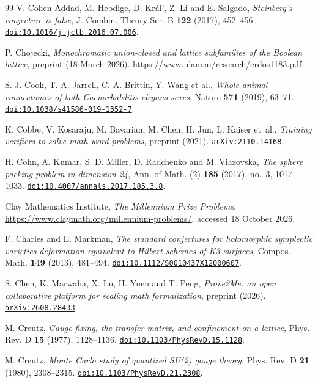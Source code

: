 \begin{thebibliography}{99}
V. Cohen-Addad, M. Hebdige, D. Kr\'al', Z. Li and E. Salgado,
\emph{Steinberg's conjecture is false},
J. Combin. Theory Ser. B \textbf{122} (2017), 452--456.
\href{https://doi.org/10.1016/j.jctb.2016.07.006}{\nolinkurl{doi:10.1016/j.jctb.2016.07.006}}.

P. Chojecki,
\emph{Monochromatic union-closed and lattice subfamilies of the Boolean lattice},
preprint (18 March 2026).
\url{https://www.ulam.ai/research/erdos1183.pdf}.

S. J. Cook, T. A. Jarrell, C. A. Brittin, Y. Wang et al.,
\emph{Whole-animal connectomes of both Caenorhabditis elegans sexes},
Nature \textbf{571} (2019), 63--71.
\href{https://doi.org/10.1038/s41586-019-1352-7}{\nolinkurl{doi:10.1038/s41586-019-1352-7}}.

K. Cobbe, V. Kosaraju, M. Bavarian, M. Chen, H. Jun, L. Kaiser et~al.,
\emph{Training verifiers to solve math word problems},
preprint (2021).
\href{https://arxiv.org/abs/2110.14168}{\nolinkurl{arXiv:2110.14168}}.

H. Cohn, A. Kumar, S. D. Miller, D. Radchenko and M. Viazovska,
\emph{The sphere packing problem in dimension 24},
Ann. of Math. (2) \textbf{185} (2017), no.~3, 1017--1033.
\href{https://doi.org/10.4007/annals.2017.185.3.8}{\nolinkurl{doi:10.4007/annals.2017.185.3.8}}.

Clay Mathematics Institute,
\emph{The Millennium Prize Problems},
\url{https://www.claymath.org/millennium-problems/}, accessed 18 October 2026.

F. Charles and E. Markman,
\emph{The standard conjectures for holomorphic symplectic varieties deformation equivalent to Hilbert schemes of K3 surfaces},
Compos. Math. \textbf{149} (2013), 481--494.
\href{https://doi.org/10.1112/S0010437X12000607}{\nolinkurl{doi:10.1112/S0010437X12000607}}.

S. Chen, K. Marwaha, X. Lu, H. Yuen and T. Peng,
\emph{Prove2Me: an open collaborative platform for scaling math formalization},
preprint (2026).
\href{https://arxiv.org/abs/2608.28433}{\nolinkurl{arXiv:2608.28433}}.

M. Creutz,
\emph{Gauge fixing, the transfer matrix, and confinement on a lattice},
Phys. Rev. D \textbf{15} (1977), 1128--1136.
\href{https://doi.org/10.1103/PhysRevD.15.1128}{\nolinkurl{doi:10.1103/PhysRevD.15.1128}}.

M. Creutz,
\emph{Monte Carlo study of quantized SU(2) gauge theory},
Phys. Rev. D \textbf{21} (1980), 2308--2315.
\href{https://doi.org/10.1103/PhysRevD.21.2308}{\nolinkurl{doi:10.1103/PhysRevD.21.2308}}.


\end{thebibliography}
